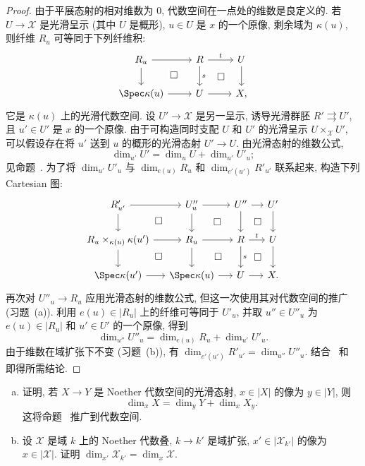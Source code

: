 \begin{proof}
由于平展态射的相对维数为 $0$, 代数空间在一点处的维数是良定义的. 若 $U\to\mathcal X$ 是光滑呈示 (其中 $U$ 是概形), $u\in U$ 是 $x$ 的一个原像, 剩余域为 $\kappa(u)$, 则纤维 $R_u$ 可等同于下列纤维积:
\[
\begin{tikzcd}
R_u\arrow[r]\arrow[d]&R\arrow[r,"t"]\arrow[d,"s"]&U\arrow[d]\\
\Spec\kappa(u)\arrow[r]\arrow[ur,phantom,"\square" description]&U\arrow[r]\arrow[ur,phantom,"\square" description]&\mathcal X,
\end{tikzcd}
\]
它是 $\kappa(u)$ 上的光滑代数空间. 设 $U'\to\mathcal X$ 是另一呈示, 诱导光滑群胚 $R'\rightrightarrows U'$, 且 $u'\in U'$ 是 $x$ 的一个原像. 由于可构造同时支配 $U$ 和 $U'$ 的光滑呈示 $U\times_{\mathcal X}U'$, 可以假设存在将 $u'$ 送到 $u$ 的概形的光滑态射 $U'\to U$. 由光滑态射的维数公式,
\begin{equation}\label{src:4.5.3}
\dim_{u'}U'=\dim_u U+\dim_{u'}U'_u;
\end{equation}
见命题~. 为了将 $\dim_{u'}U'_u$ 与 $\dim_{e(u)}R_u$ 和 $\dim_{e'(u')}R'_{u'}$ 联系起来, 构造下列 Cartesian 图:
\[
\begin{tikzcd}[column sep=small]
R'_{u'}\arrow[r]\arrow[d]&U''_u\arrow[r]\arrow[d]&U''\arrow[r]\arrow[d]&U'\arrow[d]\\
R_u\times_{\kappa(u)}\kappa(u')\arrow[r]\arrow[d]\arrow[ur,phantom,"\square" description]&R_u\arrow[r]\arrow[d]\arrow[ur,phantom,"\square" description]&R\arrow[r,"t"]\arrow[d,"s"]\arrow[ur,phantom,"\square" description]&U\arrow[d]\\
\Spec\kappa(u')\arrow[r]\arrow[ur,phantom,"\square" description]&\Spec\kappa(u)\arrow[r]\arrow[ur,phantom,"\square" description]&U\arrow[r]\arrow[ur,phantom,"\square" description]&\mathcal X.
\end{tikzcd}
\]
再次对 $U''_u\to R_u$ 应用光滑态射的维数公式, 但这一次使用其对代数空间的推广 (习题~(a)). 利用 $e(u)\in|R_u|$ 上的纤维可等同于 $U'_u$, 并取 $u''\in U''_u$ 为 $e(u)\in|R_u|$ 和 $u'\in U'$ 的一个原像, 得到
\begin{equation}\label{src:4.5.4}
\dim_{u''}U''_u=\dim_{e(u)}R_u+\dim_{u'}U'_u.
\end{equation}
由于维数在域扩张下不变 (习题~(b)), 有 $\dim_{e'(u')}R'_{u'}=\dim_{u''}U''_u$. 结合~ 和~ 即得所需结论.
\end{proof}
\begin{exercise}[细节]\label{src:4.5.5}
\begin{enumerate}[(a)]
\item 证明, 若 $X\to Y$ 是 Noether 代数空间的光滑态射, $x\in|X|$ 的像为 $y\in|Y|$, 则
\[
\dim_x X=\dim_y Y+\dim_x X_y.
\]
这将命题~ 推广到代数空间.
\item 设 $\mathcal X$ 是域 $k$ 上的 Noether 代数叠, $k\to k'$ 是域扩张, $x'\in|\mathcal X_{k'}|$ 的像为 $x\in|\mathcal X|$. 证明 $\dim_{x'}\mathcal X_{k'}=\dim_x\mathcal X$.
\end{enumerate}
\end{exercise}
